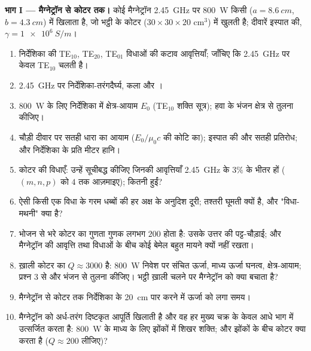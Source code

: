 \begin{problem}
\medskip
\noindent\textbf{भाग I --- मैग्नेट्रॉन से कोटर तक।}
कोई मैग्नेट्रॉन \qty{2.45}{GHz} पर \qty{800}{W} किसी  ($a = \qty{8.6}{cm}$, $b = \qty{4.3}{cm}$) में खिलाता है, जो भट्ठी के
कोटर ($30 \times 30 \times 20$ cm$^3$) में खुलती है; दीवारें इस्पात की, $\gamma = \qty{1e6}{S/m}$।
\begin{enumerate}
  \item निर्देशिका की TE$_{10}$, TE$_{20}$, TE$_{01}$ विधाओं की कटाव
        आवृत्तियाँ; जाँचिए कि \qty{2.45}{GHz} पर केवल TE$_{10}$ चलती है।
  \item \qty{2.45}{GHz} पर निर्देशिका-तरंगदैर्घ्य, कला और ।
  \item \qty{800}{W} के लिए निर्देशिका में क्षेत्र-आयाम $E_0$ (TE$_{10}$ शक्ति
        सूत्र); हवा के भंजन क्षेत्र से तुलना कीजिए।
  \item चौड़ी दीवार पर सतही धारा का आयाम ($E_0/\mu_0c$ की
        कोटि का); इस्पात की  और सतही प्रतिरोध;
        और निर्देशिका के प्रति मीटर हानि।
  \item कोटर की विधाएँ: उन्हें सूचीबद्ध कीजिए जिनकी आवृत्तियाँ
        \qty{2.45}{GHz} के $3\%$ के भीतर हों ($(m, n, p)$ को $4$ तक आज़माइए); कितनी हुईं?
  \item ऐसी किसी एक विधा के गरम धब्बों की हर अक्ष के अनुदिश दूरी;
        तश्तरी घूमती क्यों है, और "विधा-मथनी" क्या है?
  \item भोजन से भरे कोटर का गुणता गुणक लगभग $200$ होता है: उसके
        उत्तर की पट्ट-चौड़ाई; और मैग्नेट्रॉन की आवृत्ति तथा विधाओं के बीच
        कोई बेमेल बहुत मायने क्यों नहीं रखता।
  \item ख़ाली कोटर का $Q \approx 3000$ है: \qty{800}{W} निवेश पर संचित ऊर्जा,
        माध्य ऊर्जा घनत्व, क्षेत्र-आयाम; प्रश्न 3 से और भंजन से तुलना
        कीजिए। भट्ठी ख़ाली चलने पर मैग्नेट्रॉन को क्या बचाता है?
  \item मैग्नेट्रॉन से कोटर तक निर्देशिका के \qty{20}{cm} पार करने में
        ऊर्जा को लगा समय।
  \item मैग्नेट्रॉन को अर्ध-तरंग दिष्टकृत आपूर्ति खिलाती है और वह हर
        मुख्य चक्र के केवल आधे भाग में उत्सर्जित करता है: \qty{800}{W} के
        माध्य के लिए झोंकों में शिखर शक्ति; और झोंकों के बीच कोटर
        क्या करता है ($Q \approx 200$ लीजिए)?
\end{enumerate}


\end{problem}
